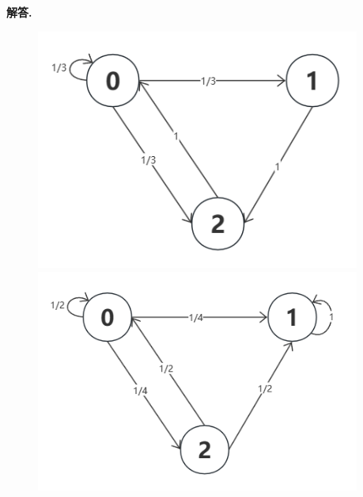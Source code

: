 \documentclass[12pt, a4paper, oneside]{ctexart}
\newenvironment{solution}{\par\noindent\textbf{解答. }}{\par}
\begin{document}
\begin{solution}
    \begin{figure}[!h]
        \centering
        \begin{minipage}[c]{0.3\textwidth}
            \centering
            \includegraphics[width=0.95\textwidth]{img/a.png}
        \end{minipage}
        \begin{minipage}[c]{0.3\textwidth}
            \centering
            \includegraphics[width=0.95\textwidth]{img/b.png}
        \end{minipage}
        \begin{minipage}[c]{0.3\textwidth}
            \centering

\end{minipage}
\end{figure}
\end{solution}
\end{document}
